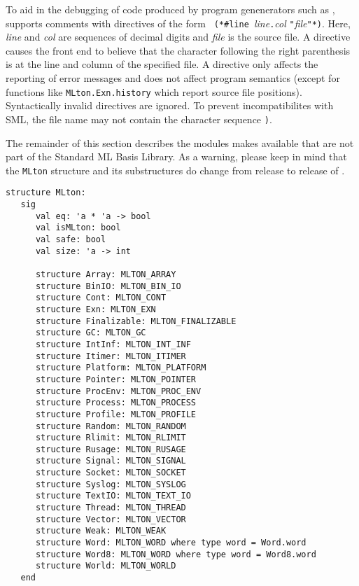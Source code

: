 %

To aid in the debugging of code produced by program genenerators such as
,
{\mlton} supports comments with {\nline} directives of the form {\tt
(*\#line }{\it line}{\tt.}{\it col} {\tt "}{\it file}{\tt"*)}.  Here,
{\it line} and {\it col} are sequences of decimal digits and {\it
file} is the source file.  A {\nline} directive causes the front end
to believe that the character following the right parenthesis is at
the line and column of the specified file.  A {\nline} directive only
affects the reporting of error messages and does not affect program
semantics (except for functions like {\tt MLton.Exn.history} which
report source file positions).  Syntactically invalid {\nline}
directives are ignored.  To prevent incompatibilites with SML, the
file name may not contain the character sequence {\tt *)}.
%

The remainder of this section describes the modules {\mlton} makes
available that are not part of the Standard ML Basis Library.  As a
warning, please keep in mind that the {\tt MLton} structure and its
substructures do change from release to release of {\mlton}.

\begin{verbatim}
structure MLton:
   sig
      val eq: 'a * 'a -> bool
      val isMLton: bool
      val safe: bool
      val size: 'a -> int

      structure Array: MLTON_ARRAY
      structure BinIO: MLTON_BIN_IO
      structure Cont: MLTON_CONT
      structure Exn: MLTON_EXN
      structure Finalizable: MLTON_FINALIZABLE
      structure GC: MLTON_GC
      structure IntInf: MLTON_INT_INF
      structure Itimer: MLTON_ITIMER
      structure Platform: MLTON_PLATFORM
      structure Pointer: MLTON_POINTER
      structure ProcEnv: MLTON_PROC_ENV
      structure Process: MLTON_PROCESS
      structure Profile: MLTON_PROFILE
      structure Random: MLTON_RANDOM
      structure Rlimit: MLTON_RLIMIT
      structure Rusage: MLTON_RUSAGE
      structure Signal: MLTON_SIGNAL
      structure Socket: MLTON_SOCKET
      structure Syslog: MLTON_SYSLOG
      structure TextIO: MLTON_TEXT_IO
      structure Thread: MLTON_THREAD
      structure Vector: MLTON_VECTOR
      structure Weak: MLTON_WEAK
      structure Word: MLTON_WORD where type word = Word.word
      structure Word8: MLTON_WORD where type word = Word8.word
      structure World: MLTON_WORLD
   end
\end{verbatim}
%
